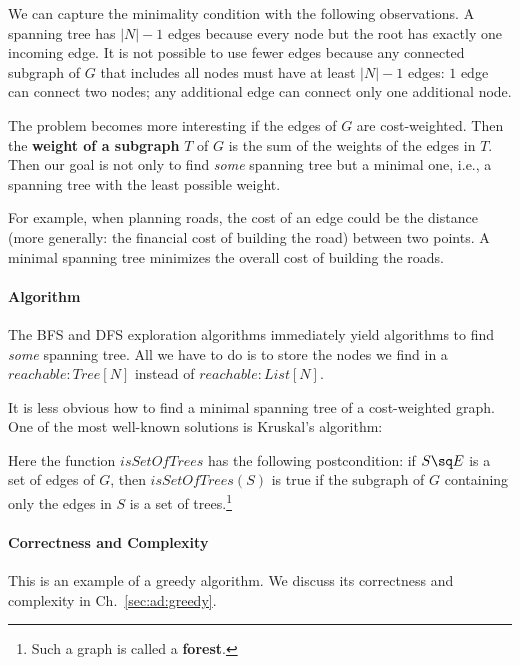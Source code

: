 We can capture the minimality condition with the following observations.
A spanning tree has $|N|-1$ edges because every node but the root has exactly one incoming edge.
It is not possible to use fewer edges because any connected subgraph of $G$ that includes all nodes must have at least $|N|-1$ edges: $1$ edge can connect two nodes; any additional edge can connect only one additional node.

The problem becomes more interesting if the edges of $G$ are cost-weighted.
Then the \textbf{weight of a subgraph} $T$ of $G$ is the sum of the weights of the edges in $T$.
Then our goal is not only to find \emph{some} spanning tree but a minimal one, i.e., a spanning tree with the least possible weight.

For example, when planning roads, the cost of an edge could be the distance (more generally: the financial cost of building the road) between two points.
A minimal spanning tree minimizes the overall cost of building the roads.

\paragraph{Algorithm}
The BFS and DFS exploration algorithms immediately yield algorithms to find \emph{some} spanning tree.
All we have to do is to store the nodes we find in a $reachable: Tree[N]$ instead of $reachable:List[N]$.

It is less obvious how to find a minimal spanning tree of a cost-weighted graph.
One of the most well-known solutions is Kruskal's algorithm:

\begin{acode}
\end{acode}

Here the function $isSetOfTrees$ has the following postcondition: if $S\sq E$ is a set of edges of $G$, then $isSetOfTrees(S)$ is true if the subgraph of $G$ containing only the edges in $S$ is a set of trees.\footnote{Such a graph is called a \textbf{forest}.}

\paragraph{Correctness and Complexity}
This is an example of a greedy algorithm.
We discuss its correctness and complexity in Ch.~\ref{sec:ad:greedy}.

